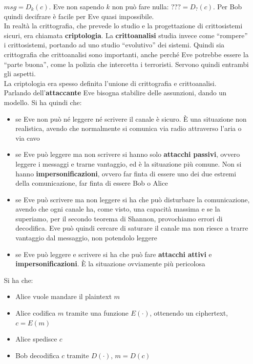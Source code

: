 \documentclass[a4paper,12pt, oneside]{book}
\begin{document}
$msg=D_k(c)$. Eve non sapendo $k$ non può fare nulla: $???=D_?(c)$.
Per Bob quindi decifrare è facile per Eve quasi impossibile.\\
In realtà la crittografia, che prevede lo studio e la progettazione di
crittosistemi sicuri, era chiamata \textbf{criptologia}. La
\textbf{crittoanalisi} studia invece come ``rompere'' i crittosistemi, portando
ad uno studio ``evolutivo'' dei sistemi. Quindi sia crittografia che
crittoanalisi sono importanti, anche perché Eve potrebbe essere la ``parte
buona'', come la polizia che intercetta i terroristi. Servono quindi entrambi
gli aspetti.\\
La criptologia era spesso definita l'unione di crittografia e crittoanalisi.\\
Parlando dell'\textbf{attaccante} Eve bisogna stabilire delle assunzioni, dando
un modello. Si ha quindi che:
\begin{itemize}
  \item se Eve non può né leggere né scrivere il canale è sicuro. È una
  situazione non realistica, avendo che normalmente si comunica via radio
  attraverso l'aria o via cavo
  \item se Eve può leggere ma non scrivere si hanno solo \textbf{attacchi
    passivi}, ovvero leggere i messaggi e trarne vantaggio, ed è
  la situazione più comune. Non si hanno \textbf{impersonificazioni}, ovvero far
  finta di essere uno dei due estremi della comunicazione, far finta di essere
  Bob o Alice
  \item se Eve può scrivere ma non leggere si ha che può disturbare la
  comunicazione, avendo che ogni canale ha, come visto, una capacità massima e
  se la superiamo, per il secondo teorema di Shannon, provochiamo errori di
  decodifica. Eve può quindi cercare di saturare il canale ma non riesce a
  trarre vantaggio dal messaggio, non potendolo leggere
  \item se Eve può leggere e scrivere si ha che può fare \textbf{attacchi
    attivi} e \textbf{impersonificazioni}. È la situazione ovviamente più
  pericolosa 
\end{itemize}
Si ha che:
\begin{itemize}
  \item Alice vuole mandare il plaintext $m$
  \item Alice codifica $m$ tramite una funzione $E(\cdot)$, ottenendo un
  ciphertext, $c=E(m)$ 
  \item Alice spedisce $c$
  \item Bob decodifica $c$ tramite $D(\cdot)$, $m=D(c)$
\end{itemize}
\end{document}
